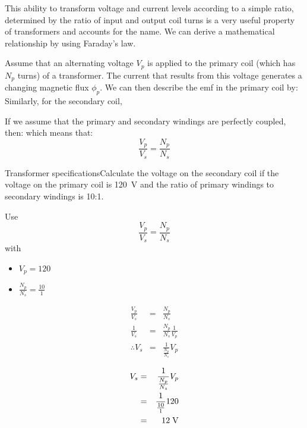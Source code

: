{This ability to transform
voltage and current levels according to a simple ratio, determined
by the ratio of input and output coil turns is a very useful property of transformers and accounts for the name. We can derive a
mathematical relationship by using Faraday's law.

Assume that an alternating voltage ${V_p}$ is applied to the
primary coil (which has $N_p$ turns) of a transformer. The current
that results from this voltage generates a changing magnetic flux $\phi_p$.
We can then describe the emf in the primary coil by:  Similarly, for the secondary
coil, 

If we assume that the primary and secondary windings are perfectly
coupled, then:  which means that:
\begin {equation*}
\frac{V_p}{V_s}=\frac{N_p}{N_s}
\end {equation*}

\begin{wex}{Transformer specifications}{Calculate the voltage on the secondary coil if the voltage on the primary coil is 120~V and the ratio of primary windings to secondary windings is 10:1.}{

 Use
\begin {equation*}
\frac{V_p}{V_s}=\frac{N_p}{N_s}
\end {equation*}
with
\begin{itemize}
\item $V_p=120$
\item $\frac{N_p}{N_s}=\frac{10}{1}$
\end{itemize}

\begin{eqnarray*}
\frac{V_p}{V_s}&=&\frac{N_p}{N_s}\\
\frac{1}{V_s}&=&\frac{N_p}{N_s}\frac{1}{V_p}\\
\therefore V_s&=&\frac{1}{\frac{N_p}{N_s}}V_p
\end{eqnarray*}

\begin{eqnarray*}
V_s&=&\frac{1}{\frac{N_p}{N_s}}V_p\\
&=&\frac{1}{\frac{10}{1}}120\\
&=&12\;\rm{V}
\end{eqnarray*}

}
\end{wex}


}
